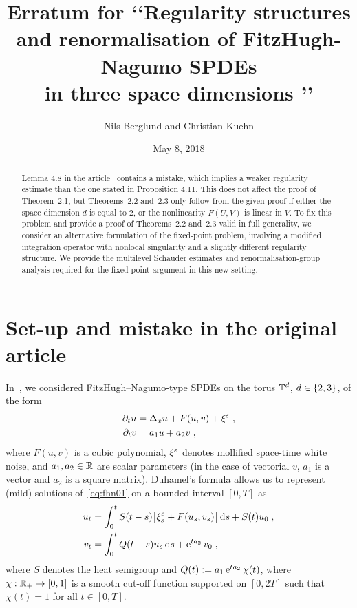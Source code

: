 \documentclass[reqno,11pt]{article}
\begin{document}

\title{Erratum for \lq\lq Regularity structures \\ and renormalisation of
FitzHugh-Nagumo SPDEs \\ in three space dimensions \rq\rq}
\author{Nils Berglund and Christian Kuehn}
\date{May 8, 2018}   


\maketitle

\begin{abstract}
Lemma 4.8 in the article~\cite{BK2016} contains a mistake, which implies a
weaker regularity estimate than the one stated in Proposition 4.11. This does
not affect the proof of Theorem~2.1, but Theorems~2.2 and~2.3 only follow from
the given proof if either the space dimension $d$ is equal to $2$, or the
nonlinearity $F(U,V)$ is linear in $V$. To fix this problem and provide a proof
of Theorems~2.2 and~2.3 valid in full generality, we consider an alternative
formulation of the fixed-point problem, involving a modified integration
operator with nonlocal singularity and a slightly different regularity
structure. We provide the multilevel Schauder estimates and 
renormalisation-group analysis required for the fixed-point argument in this 
new setting.  
\end{abstract}


\section{Set-up and mistake in the original article~\cite{BK2016}}

In~\cite{BK2016}, we considered FitzHugh--Nagumo-type SPDEs on the torus 
$\mathbb{T}^d$, $d\in\{2,3\}$, of the form
\begin{align}
\nonumber
\partial_t u &= \Delta_x u + F(u,v) + \xi^\eps\;, \\
\partial_t v &=  a_1 u + a_2 v\;,
\label{eq:fhn01} 
\end{align} 
where $F(u,v)$ is a cubic polynomial, $\xi^\varepsilon$ denotes 
mollified space-time white noise, and $a_1, a_2\in \mathbb{R}$ are scalar
parameters (in the case of vectorial $v$, $a_1$ is a vector and $a_2$ is a
square matrix). Duhamel's formula allows us to represent (mild) solutions
of~\eqref{eq:fhn01} on a bounded interval $[0,T]$ as 
\begin{align}
\nonumber
u_t &= \int_0^t S(t-s) \bigbrak{\xi^\eps_s + F(u_s,v_s)} \6s + S(t)u_0\;, \\
v_t &= \int_0^t  Q(t-s) u_s \6s + \e^{ta_2}v_0\;, 
\label{eq:fhn02} 
\end{align}
where $S$ denotes the heat semigroup and $Q(t) := a_1\operatorname{e}^{t a_2}\chi(t)$, where
$\chi:\mathbb{R}_+\to[0,1]$ is a smooth cut-off function supported on $[0,2T]$ such that
$\chi(t)=1$ for all $t\in[0,T]$. 
\end{document}
